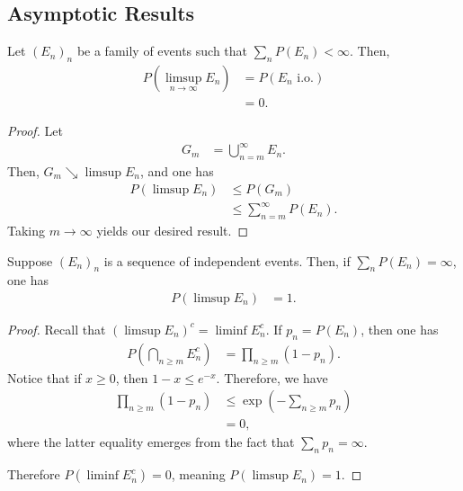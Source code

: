 \documentclass[10pt]{mypackage}
\begin{document}
\subsection{Asymptotic Results}%
\begin{theorem}
  Let $\left( E_n \right)_n$ be a family of events such that $\sum_{n}P\left( E_n \right) < \infty$. Then,
  \begin{align*}
    P\left( \limsup_{n\to\infty} E_n \right) &= P\left( E_n\text{ i.o.} \right)\\
                                             &= 0.
  \end{align*}
\end{theorem}
\begin{proof}
  Let
  \begin{align*}
    G_m &= \bigcup_{n=m}^{\infty} E_n.
  \end{align*}
  Then, $G_m\searrow \limsup E_n$, and one has
  \begin{align*}
    P\left( \limsup E_n \right) &\leq P\left( G_m \right)\\
                                &\leq \sum_{n=m}^{\infty}P\left( E_n \right).
  \end{align*}
  Taking $m\rightarrow\infty$ yields our desired result.
\end{proof}
\begin{theorem}
  Suppose $\left( E_n \right)_n$ is a sequence of independent events. Then, if $\sum_{n}P\left( E_n \right) = \infty$, one has
  \begin{align*}
    P\left( \limsup E_n \right) &= 1.
  \end{align*}
\end{theorem}
\begin{proof}
  Recall that $\left( \limsup E_n \right)^{c} = \liminf E_n^{c}$. If $p_n = P\left( E_n \right)$, then one has
  \begin{align*}
    P\left( \bigcap_{n\geq m}E_n^{c} \right) &= \prod_{n\geq m} \left( 1-p_n \right).
  \end{align*}
  Notice that if $x \geq 0$, then $1-x \leq e^{-x}$. Therefore, we have
  \begin{align*}
    \prod_{n\geq m} \left( 1-p_n \right) &\leq \exp\left( -\sum_{n\geq m}p_n \right)\\
                                         &= 0,
  \end{align*}
  where the latter equality emerges from the fact that $\sum_{n}p_n = \infty$.

  Therefore $P\left( \liminf E_n^{c} \right) = 0$, meaning $P\left( \limsup E_n \right) = 1$.
\end{proof}
\end{document}
